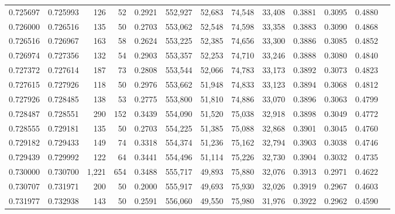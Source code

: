 \begin{tabular}{rrrrrrrrrrrrr}
0.725697 & 0.725993 &   126 &  52 &                                     0.2921 & 552,927 &  52,683 &  74,548 &  33,408 & 0.3881 & 0.3095 & 0.4880 \\
0.726000 & 0.726516 &   135 &  50 &                                     0.2703 & 553,062 &  52,548 &  74,598 &  33,358 & 0.3883 & 0.3090 & 0.4868 \\
0.726516 & 0.726967 &   163 &  58 &                                     0.2624 & 553,225 &  52,385 &  74,656 &  33,300 & 0.3886 & 0.3085 & 0.4852 \\
0.726974 & 0.727356 &   132 &  54 &                                     0.2903 & 553,357 &  52,253 &  74,710 &  33,246 & 0.3888 & 0.3080 & 0.4840 \\
0.727372 & 0.727614 &   187 &  73 &                                     0.2808 & 553,544 &  52,066 &  74,783 &  33,173 & 0.3892 & 0.3073 & 0.4823 \\
0.727615 & 0.727926 &   118 &  50 &                                     0.2976 & 553,662 &  51,948 &  74,833 &  33,123 & 0.3894 & 0.3068 & 0.4812 \\
0.727926 & 0.728485 &   138 &  53 &                                     0.2775 & 553,800 &  51,810 &  74,886 &  33,070 & 0.3896 & 0.3063 & 0.4799 \\
0.728487 & 0.728551 &   290 & 152 &                                     0.3439 & 554,090 &  51,520 &  75,038 &  32,918 & 0.3898 & 0.3049 & 0.4772 \\
0.728555 & 0.729181 &   135 &  50 &                                     0.2703 & 554,225 &  51,385 &  75,088 &  32,868 & 0.3901 & 0.3045 & 0.4760 \\
0.729182 & 0.729433 &   149 &  74 &                                     0.3318 & 554,374 &  51,236 &  75,162 &  32,794 & 0.3903 & 0.3038 & 0.4746 \\
0.729439 & 0.729992 &   122 &  64 &                                     0.3441 & 554,496 &  51,114 &  75,226 &  32,730 & 0.3904 & 0.3032 & 0.4735 \\
0.730000 & 0.730700 & 1,221 & 654 &                                     0.3488 & 555,717 &  49,893 &  75,880 &  32,076 & 0.3913 & 0.2971 & 0.4622 \\
0.730707 & 0.731971 &   200 &  50 &                                     0.2000 & 555,917 &  49,693 &  75,930 &  32,026 & 0.3919 & 0.2967 & 0.4603 \\
0.731977 & 0.732938 &   143 &  50 &                                     0.2591 & 556,060 &  49,550 &  75,980 &  31,976 & 0.3922 & 0.2962 & 0.4590 \\

\end{tabular}
